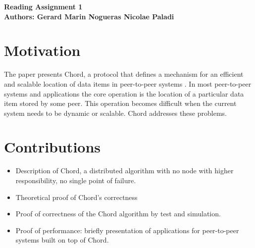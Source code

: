 \documentclass[10pt]{proc}
\begin{document}
\large{\textbf{Reading Assignment 1}}\\
\large{\textbf{Authors: Gerard Marin Nogueras \newline Nicolae Paladi}}\\
\section{Motivation}
The paper presents Chord, a protocol that defines a mechanism for an efficient and scalable location of data items in peer-to-peer systems \cite{stoica2001chord}. 
In most peer-to-peer systems and applications the core operation is the location of a particular data item stored by some peer. 
This operation becomes difficult when the current system needs to be dynamic or scalable. 
Chord addresses these problems.
\section{Contributions}
\begin{itemize}
 \item Description of Chord, a distributed algorithm with no node with higher responsibility, no single point of failure. 
 \item Theoretical proof of Chord’s correctness
 \item Proof of correctness of the Chord algorithm by test and simulation.
 \item Proof of performance: briefly presentation of applications for peer-to-peer systems built on top of Chord.
\end{itemize}
\end{document}
